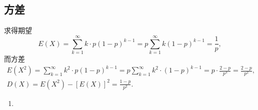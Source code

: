 \subsection{方差}
\setcounter{prob}{20}
\begin{prob}
	求得期望
	\[
		E(X)=\sum_{k=1}^{\infty}k\cdot p(1-p)^{k-1}=p\sum_{k=1}^{\infty}k(1-p)^{k-1}=\frac{1}{p},
	\]
	而方差
	\begin{gather*}
		E(X^2)=\sum_{k=1}^{\infty}k^2\cdot p(1-p)^{k-1}=p\sum_{k=1}^{\infty}k^2\cdot (1-p)^{k-1}
		=p\cdot\frac{2-p}{p^3}=\frac{2-p}{p^2},\\
		D(X)=E(X^2)-[E(X)]^2=\frac{1-p}{p^2}.
	\end{gather*}
\end{prob}
\setcounter{prob}{25}
\begin{prob}
	\begin{enumerate}
	\item 
	\end{enumerate}
\end{prob}